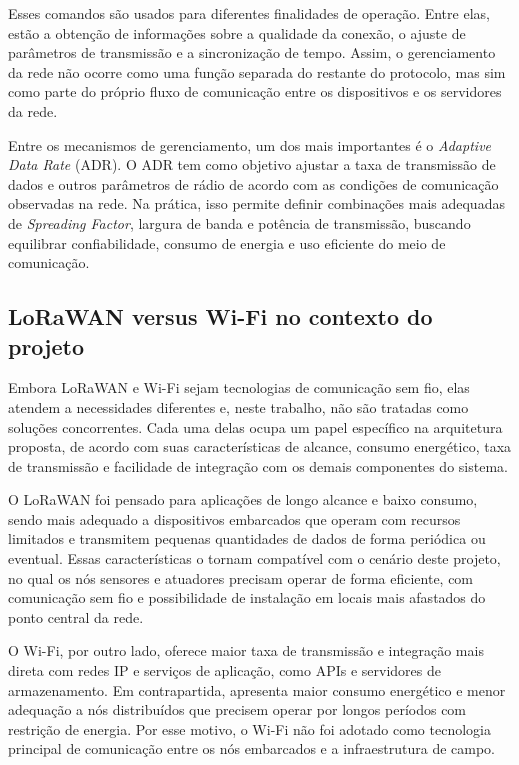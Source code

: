 Esses comandos são usados para diferentes finalidades de operação. Entre elas, estão a obtenção de informações sobre a qualidade da conexão, o ajuste de parâmetros de transmissão e a sincronização de tempo. Assim, o gerenciamento da rede não ocorre como uma função separada do restante do protocolo, mas sim como parte do próprio fluxo de comunicação entre os dispositivos e os servidores da rede. 

Entre os mecanismos de gerenciamento, um dos mais importantes é o \textit{Adaptive Data Rate} (ADR). O ADR tem como objetivo ajustar a taxa de transmissão de dados e outros parâmetros de rádio de acordo com as condições de comunicação observadas na rede. Na prática, isso permite definir combinações mais adequadas de \textit{Spreading Factor}, largura de banda e potência de transmissão, buscando equilibrar confiabilidade, consumo de energia e uso eficiente do meio de comunicação.


\subsection{LoRaWAN versus Wi-Fi no contexto do projeto}

Embora LoRaWAN e Wi-Fi sejam tecnologias de comunicação sem fio, elas atendem a necessidades diferentes e, neste trabalho, não são tratadas como soluções concorrentes. Cada uma delas ocupa um papel específico na arquitetura proposta, de acordo com suas características de alcance, consumo energético, taxa de transmissão e facilidade de integração com os demais componentes do sistema.

O LoRaWAN foi pensado para aplicações de longo alcance e baixo consumo, sendo mais adequado a dispositivos embarcados que operam com recursos limitados e transmitem pequenas quantidades de dados de forma periódica ou eventual. Essas características o tornam compatível com o cenário deste projeto, no qual os nós sensores e atuadores precisam operar de forma eficiente, com comunicação sem fio e possibilidade de instalação em locais mais afastados do ponto central da rede.

O Wi-Fi, por outro lado, oferece maior taxa de transmissão e integração mais direta com redes IP e serviços de aplicação, como APIs e servidores de armazenamento. Em contrapartida, apresenta maior consumo energético e menor adequação a nós distribuídos que precisem operar por longos períodos com restrição de energia. Por esse motivo, o Wi-Fi não foi adotado como tecnologia principal de comunicação entre os nós embarcados e a infraestrutura de campo.

